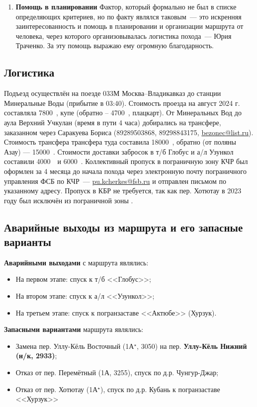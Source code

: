 \begin{enumerate}
	\item\textbf{Помощь в планировании}
	Фактор, который формально не был в списке определяющих критериев, но по факту являлся таковым~--- это искренняя заинтересованность и помощь в планировании и организации маршрута от человека, через которого организовывалась логистика похода~--- Юрия Траченко. За эту помощь выражаю ему огромную благодарность.
	
\end{enumerate} 
\subsection{Логистика}
Подъезд осуществлён на поезде 033М Москва--Владикавказ до станции Минеральные Воды (прибытие в 03:40). Стоимость проезда на август 2024 г. составляла 7800~\faRub, купе (обратно – 4700~\faRub, плацкарт). От Минеральных Вод до аула Верхний Учкулан (время в пути 4 часа) добирались на трансфере, заказанном через Саракуева Бориса (89289503868, 89298843175,  \href{mailto: bezonec@list.ru}{bezonec@list.ru}). Стоимость трансфера трансфера туда составила 18000~\faRub, обратно (от поляны Азау) — 15000~\faRub. Стоимости доставки забросок в т/б Глобус и а/л Узункол составили 4000~\faRub~и 6000~\faRub.
Коллективный пропуск в пограничную зону КЧР был оформлен за 4 месяца до начала похода через электронную почту пограничного управления ФСБ по КЧР~--- \href{mailto: pu.kcherkes@fsb.ru}{pu.kcherkes@fsb.ru} и отправлен письмом по указанному адресу. Пропуск в КБР не требуется, так как пер. Хотютау в 2023 году был исключён из пограничной зоны \cite{order_kbr}.
\subsection{Аварийные выходы из маршрута и его запасные варианты}
\textbf{Аварийными выходами} с маршрута являлись:
\begin{itemize}
	\item На первом этапе: спуск к т/б <<Глобус>>;
	\item На втором этапе: спуск к а/л <<Узункол>>;
	\item На третьем этапе: спуск к погранзаставе <<Актюбе>> (Хурзук).
\end{itemize}
\textbf{Запасными вариантами} маршрута являлись:
\begin{itemize}
	\item Замена пер. Уллу-Кёль Восточный (1А$^\star$, 3050) на пер. \textbf{Уллу-Кёль Нижний (н/к, 2933)};
	\item Отказ от пер. Перемётный (1А, 3255), спуск по д.р. Чунгур-Джар;
	\item Отказ от пер. Хотютау (1А$^\star$), спуск по д.р. Кубань к погранзаставе <<Хурзук>>
\end{itemize}
